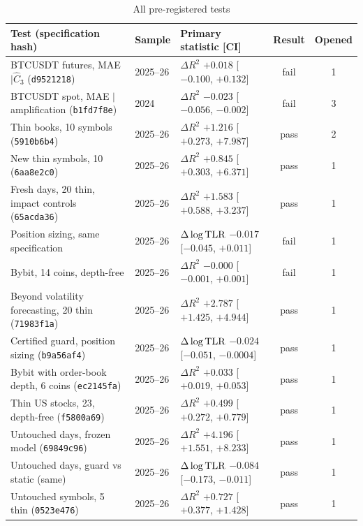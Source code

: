 \begin{table}[!htbp]\centering\footnotesize
\begin{threeparttable}
\caption{All pre-registered tests}\label{tab:alltests}
\setlength{\tabcolsep}{3pt}
\begin{tabular}{p{}lp{}cc}
\toprule
Test (specification hash) & Sample & Primary statistic [CI] & Result & Opened\\
\midrule
BTCUSDT futures, MAE $\mid\hat C_3$ (\texttt{d9521218}) & 2025--26 & $\Delta R^2$ $+0.018$ [$-0.100$, $+0.132$] & fail & 1\\
BTCUSDT spot, MAE $\mid$ amplification (\texttt{b1fd7f8e}) & 2024 & $\Delta R^2$ $-0.023$ [$-0.056$, $-0.002$] & fail & 3\\
Thin books, 10 symbols (\texttt{5910b6b4}) & 2025--26 & $\Delta R^2$ $+1.216$ [$+0.273$, $+7.987$] & pass & 2\\
New thin symbols, 10 (\texttt{6aa8e2c0}) & 2025--26 & $\Delta R^2$ $+0.845$ [$+0.303$, $+6.371$] & pass & 1\\
Fresh days, 20 thin, impact controls (\texttt{65acda36}) & 2025--26 & $\Delta R^2$ $+1.583$ [$+0.588$, $+3.237$] & pass & 1\\
Position sizing, same specification & 2025--26 & $\Delta\log{\rm TLR}$ $-0.017$ [$-0.045$, $+0.011$] & fail & 1\\
Bybit, 14 coins, depth-free & 2025--26 & $\Delta R^2$ $-0.000$ [$-0.001$, $+0.001$] & fail & 1\\
Beyond volatility forecasting, 20 thin (\texttt{71983f1a}) & 2025--26 & $\Delta R^2$ $+2.787$ [$+1.425$, $+4.944$] & pass & 1\\
Certified guard, position sizing (\texttt{b9a56af4}) & 2025--26 & $\Delta\log{\rm TLR}$ $-0.024$ [$-0.051$, $-0.0004$] & pass & 1\\
Bybit with order-book depth, 6 coins (\texttt{ec2145fa}) & 2025--26 & $\Delta R^2$ $+0.033$ [$+0.019$, $+0.053$] & pass & 1\\
Thin US stocks, 23, depth-free (\texttt{f5800a69}) & 2025--26 & $\Delta R^2$ $+0.499$ [$+0.272$, $+0.779$] & pass & 1\\
Untouched days, frozen model (\texttt{69849c96}) & 2025--26 & $\Delta R^2$ $+4.196$ [$+1.551$, $+8.233$] & pass & 1\\
Untouched days, guard vs static (same) & 2025--26 & $\Delta\log{\rm TLR}$ $-0.084$ [$-0.173$, $-0.011$] & pass & 1\\
Untouched symbols, 5 thin (\texttt{0523e476}) & 2025--26 & $\Delta R^2$ $+0.727$ [$+0.377$, $+1.428$] & pass & 1\\

\end{tabular}
\end{threeparttable}
\end{table}
